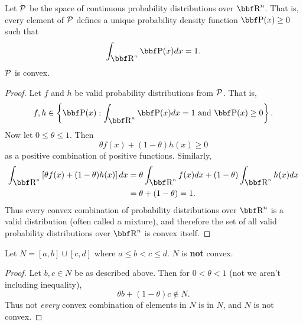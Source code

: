 \documentclass{article}
\begin{document}
\begin{example}
    Let ${\cal P}$ be the space of continuous probability distributions over
    $\RR^n$. That is, every element of ${\cal P}$ defines a unique probability
    density function $\PP(x) \geq 0$ such that \[\int_{\RR^n} \PP(x) dx=1.\]
    ${\cal P}$ is convex.
\end{example}
\begin{proof}
    Let $f$ and $h$ be valid probability distributions from ${\cal P}$. That is,
    \[
        f,h \in \left\{\PP(x) : \int_{\RR^n} \PP(x)dx = 1 \text{ and } \PP(x) \geq 0 \right\}.
    \]
    Now let $0\leq\theta\leq1$. Then
    \[
        \theta f(x) + (1-\theta) h(x) \geq 0
    \]
    as a positive combination of positive functions. Similarly,
    \begin{align*}
        \int_{\RR^n}\left[ \theta f(x) + (1-\theta) h(x) \right]dx &= \theta\int_{\RR^n}f(x)dx + (1-\theta)\int_{\RR^n}h(x)dx\\
        &= \theta + (1-\theta) = 1.
    \end{align*}
    Thus every convex combination of probability distributions over $\RR^n$ is
    a valid distribution (often called a mixture), and therefore the set of
    all valid probability distributions over $\RR^n$ is convex itself.
\end{proof}

\begin{example}
    Let $N = [a,b] \cup [c,d]$ where $a\leq b < c \leq d$.
    $N$ is \textbf{not} convex.
\end{example}
\begin{proof}
    Let $b,c\in N$ be as described above. Then for $0<\theta<1$
    (not we aren't including inequality),
    \[
        \theta b + (1-\theta)c \not\in N.
    \]
    Thus not \textit{every} convex combination of elements in
    $N$ is in $N$, and $N$ is not convex.
\end{proof}
\end{document}
